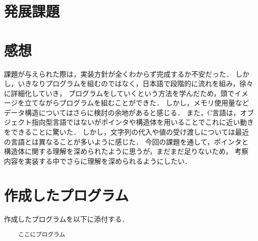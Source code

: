 \documentclass[a4j,11pt]{jarticle}
\begin{document}
\section{発展課題}\label{sec:hatten}

\section{感想}
課題が与えられた際は，実装方針が全くわからず完成するか不安だった．
しかし，いきなりプログラムを組むのではなく，日本語で段階的に流れを組み，徐々に詳細化していき，
プログラムをしていくという方法を学んだため，頭でイメージを立てながらプログラムを組むことができた．
しかし，メモリ使用量などデータ構造についてはさらに検討の余地があると感じる．
また，C言語は，オブジェクト指向型言語ではないがポインタや構造体を用いることでこれに近い動きをできることに驚いた．
しかし，文字列の代入や値の受け渡しについては最近の言語とは異なることが多いように感じた．
今回の課題を通して，ポインタと構造体に関する理解を深められたように思うが，まだまだ足りないため，
考察内容を実装する中でさらに理解を深められるようにしたい．
\section{作成したプログラム}\label{sec:program}

作成したプログラムを以下に添付する．

%
%
{\fontsize{10pt}{11pt} \selectfont
\begin{verbatim}
    ここにプログラム
\end{verbatim}
}

\end{document}
